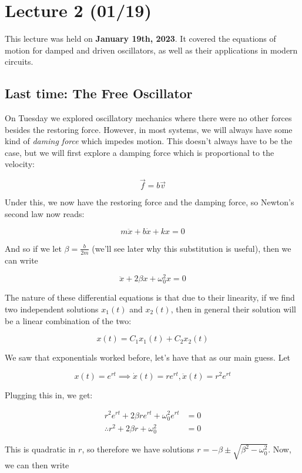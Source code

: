 \chapter{Lecture 2 (01/19)}

This lecture was held on \textbf{January 19th, 2023}. It covered the equations of motion for damped and driven oscillators, as well as their applications in modern circuits.

\section{Last time: The Free Oscillator}

On Tuesday we explored oscillatory mechanics where there were no other forces besides the restoring force. However, in most systems, we will always have some kind of \textit{daming force} which impedes motion. This doesn't always have to be the case, but we will first explore a damping force which is proportional to the velocity: 

\[ \vec f = b \vec v\]

Under this, we now have the restoring force and the damping force, so Newton's second law now reads: 

\[ m \ddot x + b \dot x + kx = 0\] 

And so if we let $\beta = \frac{b}{2m}$ (we'll see later why this substitution is useful), then we can write

\[ \ddot x + 2\beta x + \omega_0^2 x = 0\]

The nature of these differential equations is that due to their linearity, if we find two independent solutions $x_1(t)$ and $x_2(t)$, then in general their solution will be a linear combination of the two: 

\[ x(t) = C_1x_1(t) + C_2x_2(t)\] 

We saw that exponentials worked before, let's have that as our main guess. Let 

\[ x(t) = e^{rt} \implies \dot x(t) = re^{rt}, \ddot x(t) = r^2e^{rt}\] 

Plugging this in, we get: 

\begin{align*}
    r^2e^{rt} + 2\beta r e^{rt} + \omega_0^2e^{rt} &= 0\\
    \therefore r^2 + 2\beta r + \omega_0^2 &= 0
\end{align*}

This is quadratic in $r$, so therefore we have solutions $r = -\beta \pm \sqrt{\beta^2 - \omega_0^2}$. Now, we can then write

